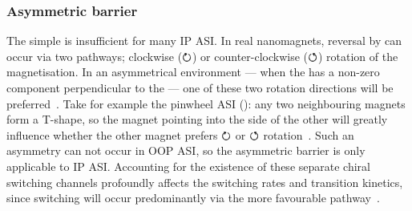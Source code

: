 \subsubsection{Asymmetric barrier}\label{sec:2:E_B_asymm}
The simple  is insufficient for many IP ASI.
In real nanomagnets, reversal by  can occur via two pathways; clockwise ($\boldsymbol{\circlearrowright}$) or counter-clockwise ($\boldsymbol{\circlearrowleft}$) rotation of the magnetisation.
In an asymmetrical environment --- when the  has a non-zero component perpendicular to the  --- one of these two rotation directions will be preferred~\cite{leo2021chiral,DirectionalEnergyBarrier}.
Take for example the pinwheel ASI (): any two neighbouring magnets form a T-shape, so the magnet pointing into the side of the other will greatly influence whether the other magnet prefers $\boldsymbol{\circlearrowright}$ or $\boldsymbol{\circlearrowleft}$ rotation~\cite{DirectionalEnergyBarrier}. %
Such an asymmetry can not occur in OOP ASI, so the asymmetric barrier is only applicable to IP ASI.
Accounting for the existence of these separate chiral switching channels profoundly affects the switching rates and transition kinetics, since switching will occur predominantly via the more favourable pathway~\cite{leo2021chiral}. \\\par

